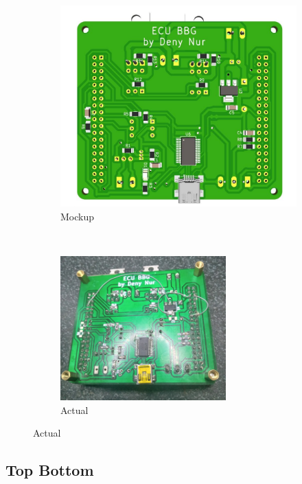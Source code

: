 \documentclass[a4paper,12pt,oneside,pdflatex,italian,final,twocolumn]{article}
\begin{document}
	\begin{figure}[h]
		\centering
		\begin{subfigure}[b]{0.32\textwidth}
			\includegraphics[width=\textwidth]{images/shield_bot.jpg}
			\caption{Mockup}
		\end{subfigure}
		~
		\begin{subfigure}[b]{0.32\textwidth}
			\includegraphics[width=0.7\textwidth,rotate=-90]{images/pcb_bot.jpg}
			\caption{Actual}
		\end{subfigure}
	\end{figure}

	\subsection{Top Bottom}
	
\end{document}

